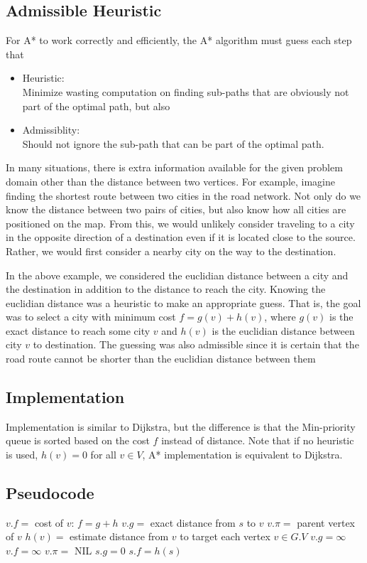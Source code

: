 \documentclass{article}
\begin{document}
\subsection{Admissible Heuristic}
For A* to work correctly and efficiently, the A* algorithm must guess each step that
\begin{itemize}
    \item Heuristic: \\
    Minimize wasting computation on finding sub-paths that are obviously not part of the optimal path\cite{HNR}, but also 
    \item Admissiblity: \\
    Should not ignore the sub-path that can be part of the optimal path\cite{HNR}.  
\end{itemize}
In many situations, there is extra information available for the given problem domain other than the distance between two vertices. For example, imagine finding the shortest route between two cities in the road network. Not only do we know the distance between two pairs of cities, but also know how all cities are positioned on the map. From this, we would unlikely consider traveling to a city in the opposite direction of a destination even if it is located close to the source. Rather, we would first consider a nearby city on the way to the destination. 

In the above example, we considered the euclidian distance between a city and the destination in addition to the distance to reach the city. Knowing the euclidian distance was a heuristic to make an appropriate guess. That is, the goal was to select a city with minimum cost $f = g(v) + h(v)$, where $g(v)$ is the exact distance to reach some city $v$ and $h(v)$ is the euclidian distance between city $v$ to destination. The guessing was also admissible since it is certain that the road route cannot be shorter than the euclidian distance between them\cite{HNR}


\subsection{Implementation}
Implementation is similar to Dijkstra, but the difference is that the Min-priority queue is sorted based on the cost $f$ instead of distance. Note that if no heuristic is used, $h(v) = 0$ for all $v \in V$, A* implementation is equivalent to Dijkstra.

\subsection{Pseudocode}
\begin{codebox}
\li \Comment $v.f = $ cost of $v$: $f = g + h$
\li \Comment $v.g = $ exact distance from $s$ to $v$
\li \Comment $v.\pi = $ parent vertex of $v$
\li \Comment $h(v) = $ estimate distance from $v$ to target
\li
\li \For each vertex $v \in G.V$
\li     \Do
            $v.g = \infty$
\li         $v.f = \infty$ 
\li         $v.\pi =$ NIL
        \End
\li $s.g = 0$
\li $s.f = h(s)$
\end{codebox}
\end{document}
